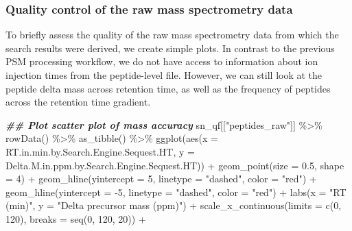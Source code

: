\documentclass[9pt,a4paper,]{extarticle}
\newenvironment{Shaded}{\begin{snugshade}}{\end{snugshade}}
\newcommand{\AttributeTok}[1]{\textcolor[rgb]{0.77,0.63,0.00}{#1}}
\newcommand{\DecValTok}[1]{\textcolor[rgb]{0.00,0.00,0.81}{#1}}
\newcommand{\DocumentationTok}[1]{\textcolor[rgb]{0.56,0.35,0.01}{\textbf{\textit{#1}}}}
\newcommand{\FloatTok}[1]{\textcolor[rgb]{0.00,0.00,0.81}{#1}}
\newcommand{\FunctionTok}[1]{\textcolor[rgb]{0.00,0.00,0.00}{#1}}
\newcommand{\NormalTok}[1]{#1}
\newcommand{\SpecialCharTok}[1]{\textcolor[rgb]{0.00,0.00,0.00}{#1}}
\newcommand{\StringTok}[1]{\textcolor[rgb]{0.31,0.60,0.02}{#1}}
\begin{document}
\hypertarget{quality-control-of-the-raw-mass-spectrometry-data-1}{%
\subsubsection{Quality control of the raw mass spectrometry data}\label{quality-control-of-the-raw-mass-spectrometry-data-1}}

To briefly assess the quality of the raw mass spectrometry data from which the
search results were derived, we create simple plots. In contrast to the previous
PSM processing workflow, we do not have access to information about ion injection
times from the peptide-level file. However, we can still look at the peptide
delta mass across retention time, as well as the frequency of peptides across
the retention time gradient.

\begin{Shaded}
\begin{Highlighting}[]
\DocumentationTok{\#\# Plot scatter plot of mass accuracy}
\NormalTok{sn\_qf[[}\StringTok{"peptides\_raw"}\NormalTok{]] }\SpecialCharTok{\%\textgreater{}\%}
  \FunctionTok{rowData}\NormalTok{() }\SpecialCharTok{\%\textgreater{}\%}
  \FunctionTok{as\_tibble}\NormalTok{() }\SpecialCharTok{\%\textgreater{}\%}
  \FunctionTok{ggplot}\NormalTok{(}\FunctionTok{aes}\NormalTok{(}\AttributeTok{x =}\NormalTok{ RT.in.min.by.Search.Engine.Sequest.HT,}
             \AttributeTok{y =}\NormalTok{ Delta.M.in.ppm.by.Search.Engine.Sequest.HT)) }\SpecialCharTok{+}
  \FunctionTok{geom\_point}\NormalTok{(}\AttributeTok{size =} \FloatTok{0.5}\NormalTok{, }\AttributeTok{shape =} \DecValTok{4}\NormalTok{) }\SpecialCharTok{+}
  \FunctionTok{geom\_hline}\NormalTok{(}\AttributeTok{yintercept =} \DecValTok{5}\NormalTok{, }\AttributeTok{linetype =} \StringTok{"dashed"}\NormalTok{, }\AttributeTok{color =} \StringTok{"red"}\NormalTok{) }\SpecialCharTok{+}
  \FunctionTok{geom\_hline}\NormalTok{(}\AttributeTok{yintercept =} \SpecialCharTok{{-}}\DecValTok{5}\NormalTok{, }\AttributeTok{linetype =} \StringTok{"dashed"}\NormalTok{, }\AttributeTok{color =} \StringTok{"red"}\NormalTok{) }\SpecialCharTok{+}
  \FunctionTok{labs}\NormalTok{(}\AttributeTok{x =} \StringTok{"RT (min)"}\NormalTok{, }\AttributeTok{y =} \StringTok{"Delta precursor mass (ppm)"}\NormalTok{) }\SpecialCharTok{+}
  \FunctionTok{scale\_x\_continuous}\NormalTok{(}\AttributeTok{limits =} \FunctionTok{c}\NormalTok{(}\DecValTok{0}\NormalTok{, }\DecValTok{120}\NormalTok{), }\AttributeTok{breaks =} \FunctionTok{seq}\NormalTok{(}\DecValTok{0}\NormalTok{, }\DecValTok{120}\NormalTok{, }\DecValTok{20}\NormalTok{)) }\SpecialCharTok{+}

\end{Highlighting}
\end{Shaded}
\end{document}
